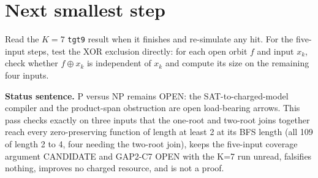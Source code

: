 \documentclass[11pt]{article}
\begin{document}
\section*{Next smallest step}
Read the $K=7$ \texttt{tgt9} result when it finishes and re-simulate any hit. For the five-input steps, test the XOR exclusion directly: for each open orbit $f$ and input $x_k$, check whether $f\oplus x_k$ is independent of $x_k$ and compute its size on the remaining four inputs.

\bigskip
\noindent\textbf{Status sentence.} P versus NP remains OPEN: the SAT-to-charged-model compiler and the product-span obstruction are open load-bearing arrows. This pass checks exactly on three inputs that the one-root and two-root joins together reach every zero-preserving function of length at least 2 at its BFS length (all 109 of length 2 to 4, four needing the two-root join), keeps the five-input coverage argument CANDIDATE and GAP2-C7 OPEN with the K=7 run unread, falsifies nothing, improves no charged resource, and is not a proof.
\end{document}
